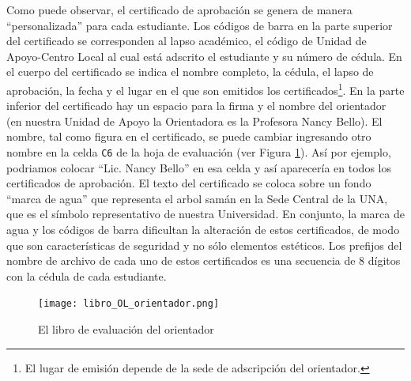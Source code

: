\documentclass[letterpaper,12pt]{book}
\begin{document}
Como puede observar, el certificado de aprobación se genera de manera ``personalizada'' para cada estudiante. Los códigos de barra en la parte superior del certificado se corresponden al lapso académico, el código de Unidad de Apoyo-Centro Local al cual está adscrito el estudiante y su número de cédula. En el cuerpo del certificado se indica el nombre completo, la cédula, el lapso de aprobación, la fecha y el lugar en el que son emitidos los certificados\footnote{El lugar de emisión depende de la sede de adscripción del orientador.}. En la parte inferior del certificado hay un espacio para la firma y el nombre del orientador (en nuestra Unidad de Apoyo la Orientadora es la Profesora Nancy Bello). El nombre, tal como figura en el certificado, se puede cambiar ingresando otro nombre en la celda \texttt{C6} de la hoja de evaluación (ver Figura \ref{fig:libro_OL_orientador}). Así por ejemplo, podriamos colocar ``Lic. Nancy Bello'' en esa celda y así aparecería en todos los certificados de aprobación. El texto del certificado se coloca sobre un fondo ``marca de agua'' que representa el arbol samán en la Sede Central de la UNA, que es el símbolo representativo de nuestra Universidad.  En conjunto, la marca de agua y los códigos de barra dificultan la alteración de estos certificados, de modo que son características de seguridad y no sólo elementos estéticos.  Los prefijos del nombre de archivo de cada uno de estos certificados es una secuencia de 8 dígitos con la cédula de cada estudiante.

\begin{figure}[!ht]
	\centering
	\texttt{[image: libro\_OL\_orientador.png]}
	\caption{El libro de evaluación del orientador}
	\label{fig:libro_OL_orientador}
\end{figure}





\backmatter
%
%
\end{document}
